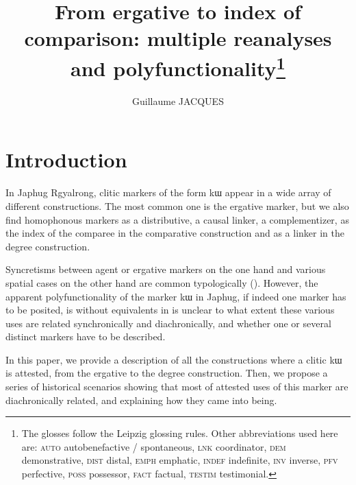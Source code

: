 \documentclass[oldfontcommands,oneside,a4paper,11pt]{article}
\newcommand{\ipa}[1]{{\phon #1}} %
\begin{document}
 
\linenumbers

\title{From ergative to index of comparison: multiple reanalyses and polyfunctionality\footnote{The glosses follow the Leipzig glossing rules. Other abbreviations used here are:   \textsc{auto} autobenefactive / spontaneous, \textsc{lnk} coordinator, \textsc{dem} demonstrative, \textsc{dist} distal, \textsc{emph} emphatic, \textsc{indef} indefinite, \textsc{inv} inverse,  \textsc{pfv} perfective, \textsc{poss} possessor, \textsc{fact} factual,  \textsc{testim} testimonial.} }

\author{Guillaume JACQUES}
\maketitle
 
 \section{Introduction}
 
 
In Japhug Rgyalrong, clitic markers of the form \ipa{kɯ} appear in a wide array of different constructions. The most common one is the ergative marker, but we also find homophonous markers as a distributive, a causal linker, a complementizer,    as the index of the comparee in the comparative construction  and as a linker in the degree construction.

Syncretisms between agent or ergative markers  on the one hand and various spatial cases on the other hand are common typologically (\citealt{agent02palancar}). However, the apparent polyfunctionality of the marker \ipa{kɯ} in Japhug, if indeed one marker has to be posited, is without equivalents in is unclear to what extent these various uses are related synchronically and diachronically, and whether one or several distinct markers have to be described.
 
 In this paper, we provide a description of all the constructions where a clitic \ipa{kɯ} is attested, from the ergative to the degree construction. Then, we propose a series of historical scenarios showing that most of  attested uses of this marker are diachronically related, and explaining how they  came into being.
\end{document}
